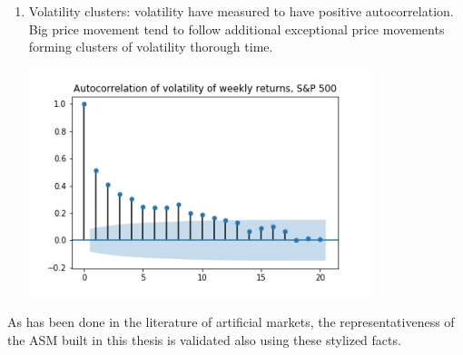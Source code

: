 \begin{enumerate}
    \item Volatility clusters: volatility have measured to have positive autocorrelation. Big price movement tend to follow additional exceptional price movements forming clusters of volatility thorough time.
    \par
    \begin{minipage}{\linewidth}
        \centering
        \includegraphics[width=10cm]{plots/S&P500_vola_autocorr.png}
        \label{fig:sp_volaclusters}
    \end{minipage}
\end{enumerate} 


As has been done in the literature of artificial markets, the 
representativeness of the ASM built in this thesis is validated also 
using these stylized facts.